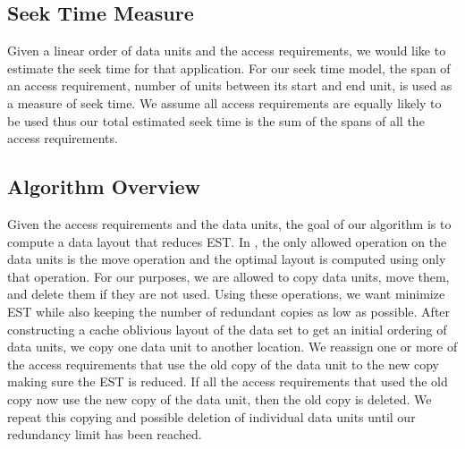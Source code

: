 \subsection{Seek Time Measure}

Given a linear order of data units and the access requirements, we would like to
estimate the seek time for that application.  For our seek time model, the
span of an access requirement, number of units between its start and end unit, is used as a measure of seek time.
 We assume all access requirements are equally likely to be used thus 
our total estimated seek time is the sum of the spans of all the access requirements. 


\subsection{Algorithm Overview}

Given the access requirements and the data units, the goal of our algorithm is to compute a data layout that reduces EST. In \cite{cacheobliviouslayout}, the only allowed operation on the data units is
the move operation and the optimal layout is computed using only that
operation. For our purposes, we are allowed to copy data units, move them, and
delete them if they are not used. Using these operations, we want minimize EST
while also keeping the number of redundant copies as low as possible. After constructing a cache oblivious layout 
of the data set to get an initial ordering of data units, we copy one data unit
to another location. We reassign one or more of the access requirements that
use the old copy of the data unit to the new copy making sure the EST is
reduced.  If all the access requirements that used the old copy now use the
new copy of the data unit, then the old copy is deleted.  We repeat this
copying and possible deletion of individual data units until our redundancy
limit has been reached. 
